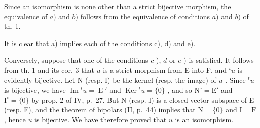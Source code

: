 Since an isomorphism is none other than a strict bijective morphism, the equivalence of \(a)\) and \(b)\) follows from the equivalence of conditions \(a)\) and \(b)\) of th. 1.

It is clear that a) implies each of the conditions c), d) and e).

Conversely, suppose that one of the conditions \(c\) ), \(d\) or \(e\) ) is satisfied. It follows from th. 1 and its cor. 3 that \(u\) is a strict morphism from E into F, and \({}^t u\) is evidently bijective. Let N (resp. I) be the kernel (resp. the image) of \(u\) . Since \({}^t u\) is bijective, we have \(\operatorname{Im} {}^t u = \operatorname{E}'\) and \(\operatorname{Ker} {}^t u = \{0\}\) , and so \(\mathrm{N}^\circ = \mathrm{E}'\) and \(\mathrm{I}^\circ = \{0\}\) by prop. 2 of IV, p.~27. But N (resp. I) is a closed vector subspace of E (resp. F), and the theorem of bipolars (II, p.~44) implies that \(\mathrm{N} = \{0\}\) and \(\mathrm{I} = \mathrm{F}\) , hence \(u\) is bijective. We have therefore proved that \(u\) is an isomorphism.

